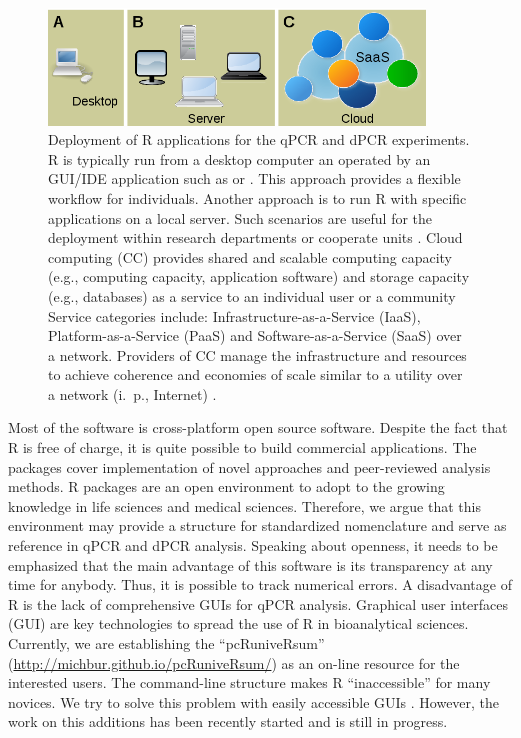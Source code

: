 \begin{figure}[htbp]
  \centering
  \includegraphics[clip=true, trim=0.05cm 0cm 0.06cm 0.05cm, width=10cm]{figures/options.png}
  \caption{Deployment of R applications for the qPCR and dPCR experiments. 
 R is typically run from a desktop computer an operated by an 
GUI/IDE application such as  or . This approach 
provides a flexible workflow for individuals.  Another approach is 
to run R with specific applications on a local server. Such scenarios are 
useful 
for the deployment within research departments or cooperate units 
\citep{R_web}. 
 Cloud computing (CC) provides shared and scalable computing 
capacity (e.g., computing capacity, application software) and storage capacity 
(e.g., databases) as a service to an individual user or a community Service 
categories include: Infrastructure-as-a-Service (IaaS), Platform-as-a-Service 
(PaaS) and Software-as-a-Service (SaaS) over a network. Providers of CC manage 
the infrastructure and resources to achieve coherence and economies of scale 
similar to a utility over a network (i.~p., Internet) \citep{R_cloud}.}
  \label{figure:options}
\end{figure} 

Most of the software is cross-platform open source software. Despite the fact 
that R is free of charge, it is quite possible to build commercial applications. 
The packages cover implementation of novel approaches and peer-reviewed analysis 
methods. R packages are an open environment to adopt to the growing knowledge in 
life sciences and medical sciences. Therefore, we argue that this environment may provide a 
structure for standardized nomenclature and serve as reference in qPCR and dPCR 
analysis. Speaking about openness, it needs to be emphasized that the main 
advantage of this software is its transparency at any time for anybody. Thus, it 
is possible to track numerical errors.  A disadvantage of R is the lack of 
comprehensive GUIs for qPCR analysis. Graphical user interfaces 
(GUI) are key technologies to spread the use of R in bioanalytical sciences. 
Currently, we are establishing the ``pcRuniveRsum'' 
(\url{http://michbur.github.io/pcRuniveRsum/}) as an on-line resource for the 
interested users. The command-line structure makes R ``inaccessible'' for many 
novices. We try to solve this problem with easily accessible GUIs 
\citep{rodiger_rkward_2012}. However, the work on this additions has been 
recently started and is still in progress.

